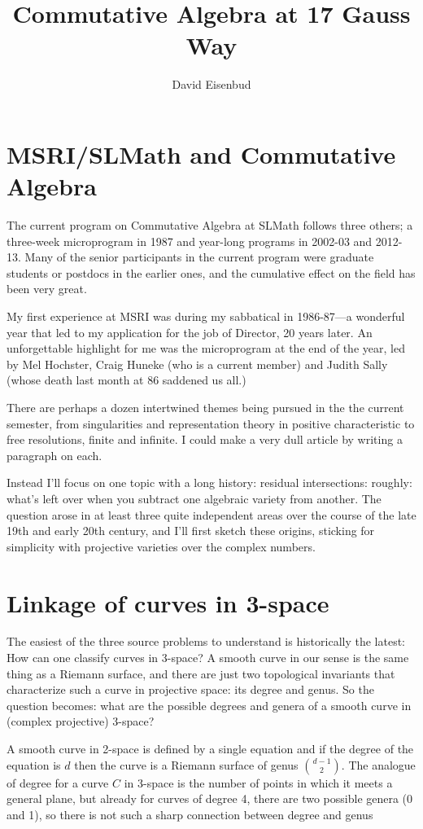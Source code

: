 \documentclass[11pt, oneside]{article}   	%
\title{Commutative Algebra at 17 Gauss Way}
\author{David Eisenbud}
\begin{document}
\maketitle
\section{MSRI/SLMath and Commutative Algebra}

The current program on Commutative Algebra at SLMath follows three others; a three-week microprogram in 1987 and year-long programs in 2002-03 and 2012-13. Many of the senior participants in the current program were graduate students or postdocs in the earlier ones, and the cumulative effect on the field has been very great.

My first experience at MSRI was during my sabbatical in 1986-87---a wonderful year that led to my application for the job of Director, 20 years later. An unforgettable highlight for me was the microprogram at the end of the year, led by Mel Hochster, Craig Huneke (who is a current member) and Judith Sally (whose death last month at 86 saddened us all.)

There are perhaps a dozen intertwined themes being pursued in the the current semester, from singularities and representation theory in positive characteristic to free resolutions, finite and infinite. I could make a very dull article by writing a paragraph on each. 

Instead I'll focus on one topic with a long history: residual intersections: roughly: what's left over when you subtract one algebraic variety from another. The question arose in at least three quite independent areas over the course of the late 19th and early 20th century, and I'll first sketch these origins, sticking for simplicity with projective varieties over the complex numbers.

\section{Linkage of curves in 3-space} The easiest of the three source problems to understand is historically the latest: How can one classify curves in 3-space? A smooth curve in our sense is the same thing as a Riemann surface, and there are just two topological invariants that characterize such a curve in projective space: its degree and genus. So the question becomes: what are the possible degrees and genera
of a smooth curve in (complex projective) 3-space?

A  smooth curve in 2-space is defined by a single equation and if the degree of the equation is $d$ then the curve is a Riemann surface of genus $d-1\choose 2$.
The analogue of degree for a curve $C$ in 3-space is the number of points in which it meets a general plane, but already for curves of degree 4, there are two possible genera (0 and 1), so there is not such a 
sharp connection between degree and genus 
\end{document}
